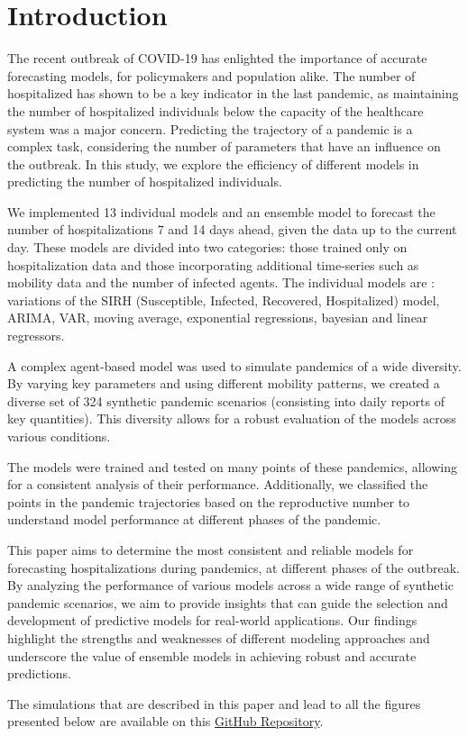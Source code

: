 \section{Introduction}

The recent outbreak of COVID-19 has enlighted the importance of accurate forecasting models, for policymakers and population alike. 
The number of hospitalized has shown to be a key indicator in the last pandemic, as maintaining the number of hospitalized individuals below the capacity of the healthcare system was a major concern.
Predicting the trajectory of a pandemic is a complex task, considering the number of parameters that have an influence on the outbreak. 
In this study, we explore the efficiency of different models in predicting the number of hospitalized individuals. 

We implemented 13 individual models and an ensemble model to forecast the number of hospitalizations 7 and 14 days ahead, given the data up to the current day.
These models are divided into two categories: those trained only on hospitalization data and those incorporating additional time-series such as mobility data and the number of infected agents. 
The individual models are : variations of the SIRH (Susceptible, Infected, Recovered, Hospitalized) model, ARIMA, VAR, moving average, exponential regressions, bayesian and linear regressors.

A complex agent-based model was used to simulate pandemics of a wide diversity. 
By varying key parameters and using different mobility patterns, we created a diverse set of 324 synthetic pandemic scenarios (consisting into daily reports of key quantities). 
This diversity allows for a robust evaluation of the models across various conditions.

The models were trained and tested on many points of these pandemics, allowing for a consistent analysis of their performance. 
Additionally, we classified the points in the pandemic trajectories based on the reproductive number to understand model performance at different phases of the pandemic.

This paper aims to determine the most consistent and reliable models for forecasting hospitalizations during pandemics, at different phases of the outbreak. 
By analyzing the performance of various models across a wide range of synthetic pandemic scenarios, we aim to provide insights that can guide the selection and development of predictive models for real-world applications. 
Our findings highlight the strengths and weaknesses of different modeling approaches and underscore the value of ensemble models in achieving robust and accurate predictions.

The simulations that are described in this paper and lead to all the figures presented below are available on this  \href{https://github.com/gregoirebechade/covid_internship}{GitHub Repository}\label{github-link}.
